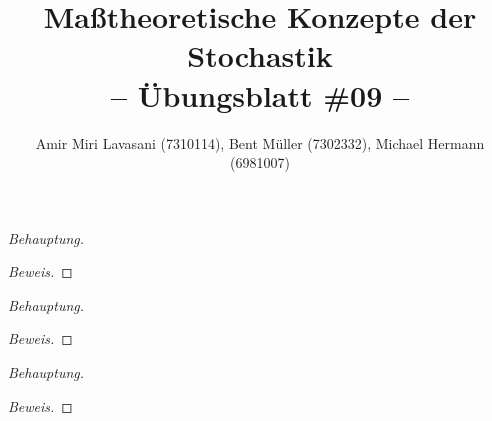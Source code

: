 \documentclass[10pt]{article}
\newcommand{\beh}{\textit{Behauptung. }}
\newenvironment{Aufgabe}[2][Aufgabe]{\begin{trivlist}
\item[\hskip \labelsep {\bfseries #1}\hskip \labelsep {\bfseries #2.}]}{\end{trivlist}}
\begin{document}
 
\title{ \textbf{Maßtheoretische Konzepte der Stochastik \\ -- Übungsblatt \#09 --} }

\author{Amir Miri Lavasani (7310114), Bent Müller (7302332),
        Michael Hermann (6981007)}
\maketitle

\begin{Aufgabe}{1} %
\end{Aufgabe}

\beh

\begin{proof}[Beweis]
	 
\end{proof}

\begin{Aufgabe}{2} %
	
\end{Aufgabe}

\beh 

\begin{proof}[Beweis]  
\end{proof}

\begin{Aufgabe}{3} %
\end{Aufgabe}

\beh 

\begin{proof}[Beweis]
\end{proof}
\end{document}
